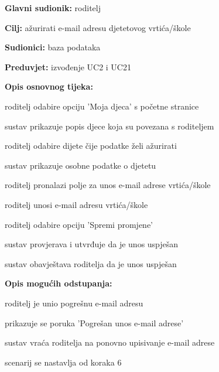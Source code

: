 					\noindent {}
					\begin{packed_item}
	
						\item \textbf{Glavni sudionik: }roditelj
						\item  \textbf{Cilj:} ažurirati e-mail adresu djetetovog vrtića/škole
						\item  \textbf{Sudionici:} baza podataka
						\item  \textbf{Preduvjet:} izvođenje UC2 i UC21
						\item  \textbf{Opis osnovnog tijeka:}
						
						\item[] \begin{packed_enum}
							\item roditelj odabire opciju 'Moja djeca' s početne stranice
							\item sustav prikazuje popis djece koja su povezana s roditeljem
							\item roditelj odabire dijete čije podatke želi ažurirati
							\item sustav prikazuje osobne podatke o djetetu
							\item roditelj pronalazi polje za unos e-mail adrese vrtića/škole
							\item roditelj unosi e-mail adresu vrtića/škole
							\item roditelj odabire opciju 'Spremi promjene'
							\item sustav provjerava i utvrđuje da je unos uspješan
							\item sustav obavještava roditelja da je unos uspješan
			
						\end{packed_enum}
						
						\item  \textbf{Opis mogućih odstupanja:}
						
						\item[] \begin{packed_item}
							\item[8.a] roditelj je unio pogrešnu e-mail adresu 
							\item[] 
							\begin{packed_enum} 
								\item prikazuje se poruka 'Pogrešan unos e-mail adrese'
								\item sustav vraća roditelja na ponovno upisivanje e-mail adrese
								\item scenarij se nastavlja od koraka 6
								
							\end{packed_enum}
						\end{packed_item}
						
					\end{packed_item}


